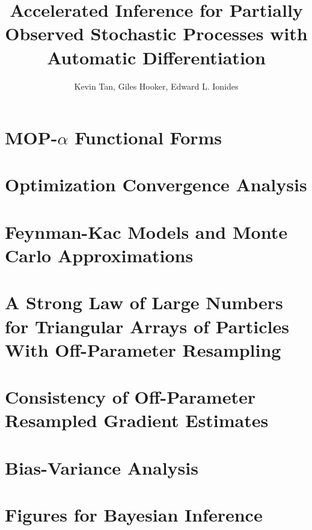 \documentclass[9pt,twoside,lineno]{pnas-new-si}
\begin{document}
\title{Accelerated Inference for Partially Observed Stochastic Processes with Automatic Differentiation}
\author{Kevin Tan, Giles Hooker, Edward L. Ionides}






\maketitle

\SItext




\section{MOP-$\alpha$ Functional Forms}


\label{appendix:functional}



\section{Optimization Convergence Analysis}
\label{appendix:convergence}


\section{Feynman-Kac Models and Monte Carlo Approximations}
\label{appendix:feynman}


\section{A Strong Law of Large Numbers for Triangular Arrays of Particles With Off-Parameter Resampling}
\label{appendix:targeting}



\section{Consistency of Off-Parameter Resampled Gradient Estimates}
\label{appendix:consistency}


\section{Bias-Variance Analysis}
\label{appendix:biasvar}


\section{Figures for Bayesian Inference}
\label{appendix:bayes}




\end{document}
